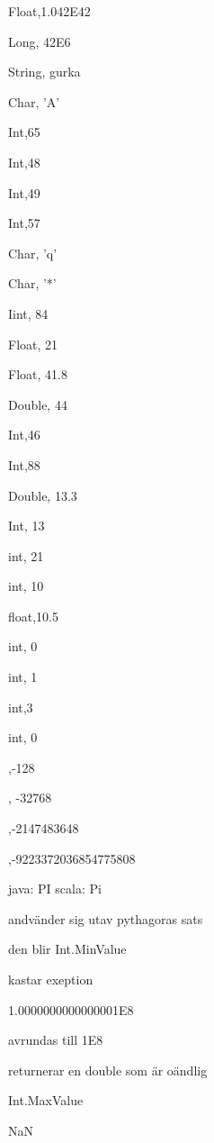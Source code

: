 \Subtask Float,1.042E42

\Subtask Long, 42E6

\Subtask String, gurka

\Subtask Char, 'A'

\Subtask Int,65

\Subtask Int,48

\Subtask Int,49

\Subtask Int,57

\Subtask  Char, 'q'

\Subtask  Char, '*'

\Task %
\Subtask Iint, 84

\Subtask Float, 21

\Subtask Float, 41.8

\Subtask Double, 44

\Task %
\Subtask Int,46

\Subtask Int,88

\Subtask Double, 13.3

\Subtask Int, 13

\Task %
\Subtask  int, 21

\Subtask  int, 10

\Subtask float,10.5

\Subtask int, 0

\Subtask int, 1

\Subtask int,3

\Subtask int, 0


\Task %
,-128

, -32768

,-2147483648

,-9223372036854775808

\Task %
\Subtask 
java: PI scala: Pi

\Subtask andvänder sig utav pythagoras sats

\Subtask 

\Task %
\Subtask den blir Int.MinValue

\Subtask kastar exeption

\Subtask 1.0000000000000001E8

\Subtask avrundas till 1E8


\Subtask returnerar en double som är oändlig

\Subtask Int.MaxValue

\Subtask NaN

